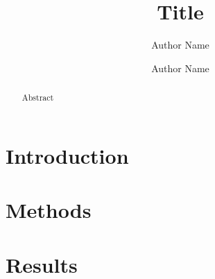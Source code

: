 \documentclass[leqno,oneeqnum,onefignum,onetabnum,final]{siamart190516}
\title{Title}
\author{
     Author Name\footnotemark[1]
\and Author Name\footnotemark[2]
}
\begin{document}
\maketitle

\renewcommand{\thefootnote}{\fnsymbol{footnote}}






\begin{abstract}
Abstract
\end{abstract}




\section{Introduction}\label{s:intro}



\section{Methods}\label{s:methods}



\section{Results}\label{s:results}
\end{document}
